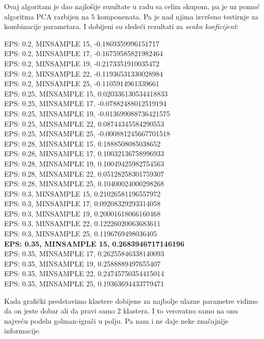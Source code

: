 \documentclass[a4paper, 11pt]{article}
\begin{document}
Ovaj algoritam je dao najlo\v{s}ije rezultate u radu sa celim skupom,
pa je uz pomo\'{c} algoritma PCA razbijen na 5 komponenata.
Pa je nad njima izvr\v{s}eno testirnje za kombinacije parametara.
I dobijeni su slede\'{c}i rezultati za \emph{senka koeficijent}:\\
{\scriptsize
EPS: 0.2, MINSAMPLE 15, -0.1869359996151717\\
EPS: 0.2, MINSAMPLE 17, -0.16759585821982464\\
EPS: 0.2, MINSAMPLE 19, -0.2173351910035472\\
EPS: 0.2, MINSAMPLE 22, -0.11936531330028984\\
EPS: 0.2, MINSAMPLE 25, -0.1105914961339661\\
EPS: 0.25, MINSAMPLE 15, 0.020336130534418833\\
EPS: 0.25, MINSAMPLE 17, -0.07882488012519194\\
EPS: 0.25, MINSAMPLE 19, -0.013699088736421575\\
EPS: 0.25, MINSAMPLE 22, 0.08744345584290553\\
EPS: 0.25, MINSAMPLE 25, -0.000881245667701518\\
EPS: 0.28, MINSAMPLE 15, 0.1888508085038652\\
EPS: 0.28, MINSAMPLE 17, 0.10032136758996933\\
EPS: 0.28, MINSAMPLE 19, 0.10049425982754563\\
EPS: 0.28, MINSAMPLE 22, 0.05128258301759307\\
EPS: 0.28, MINSAMPLE 25, 0.10400024000298268\\
EPS: 0.3, MINSAMPLE 15, 0.21026581196557972\\
EPS: 0.3, MINSAMPLE 17, 0.09208329293314058\\
EPS: 0.3, MINSAMPLE 19, 0.20001618066160468\\
EPS: 0.3, MINSAMPLE 22, 0.12226020063683611\\
EPS: 0.3, MINSAMPLE 25, 0.1196769498036405\\
\textbf{EPS: 0.35, MINSAMPLE 15, 0.2683946717146196}\\
EPS: 0.35, MINSAMPLE 17, 0.26255846338140093\\
EPS: 0.35, MINSAMPLE 19, 0.2588889497655407\\
EPS: 0.35, MINSAMPLE 22, 0.24745750354415014\\
EPS: 0.35, MINSAMPLE 25, 0.19363694433779471\\
\par}

Kada grafi\v{c}ki predstavimo klastere dobijene za najbolje ulazne parametre
vidimo da on jeste dobar ali da pravi samo 2 klastera. I to verovatno
samo na onu najve\'{c}u podelu golman-igra\v{c}i u polju. Pa nam i ne daje
neke zna\v{c}ajnije informacije.
\end{document}
